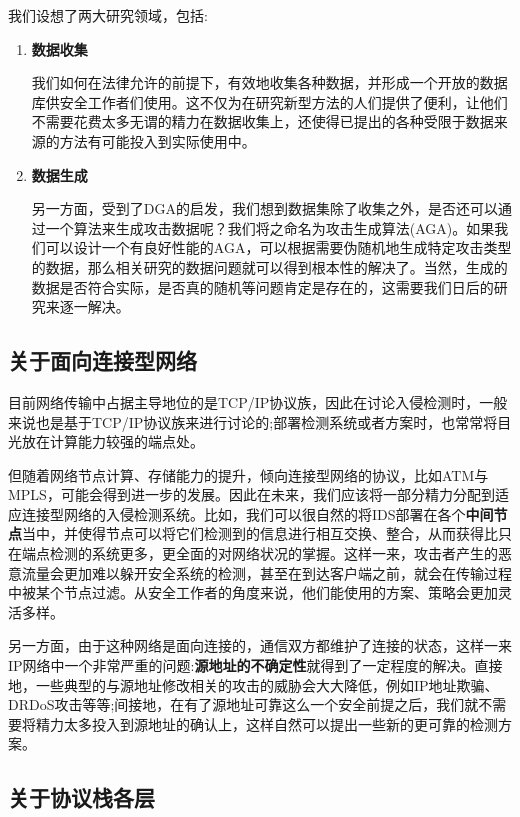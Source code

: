 \documentclass[12pt]{article} %
\begin{document}
我们设想了两大研究领域，包括:

\begin{enumerate}
	\item \textbf{数据收集}

	我们如何在法律允许的前提下，有效地收集各种数据，并形成一个开放的数据库供安全工作者们使用。这不仅为在研究新型方法的人们提供了便利，让他们不需要花费太多无谓的精力在数据收集上，还使得已提出的各种受限于数据来源的方法有可能投入到实际使用中。

	\item \textbf{数据生成}

	另一方面，受到了DGA的启发，我们想到数据集除了收集之外，是否还可以通过一个算法来生成攻击数据呢？我们将之命名为攻击生成算法(AGA)。如果我们可以设计一个有良好性能的AGA，可以根据需要伪随机地生成特定攻击类型的数据，那么相关研究的数据问题就可以得到根本性的解决了。当然，生成的数据是否符合实际，是否真的随机等问题肯定是存在的，这需要我们日后的研究来逐一解决。
\end{enumerate}
\subsection{关于面向连接型网络}
\label{connect}

目前网络传输中占据主导地位的是TCP/IP协议族，因此在讨论入侵检测时，一般来说也是基于TCP/IP协议族来进行讨论的;部署检测系统或者方案时，也常常将目光放在计算能力较强的端点处。

但随着网络节点计算、存储能力的提升，倾向连接型网络的协议，比如ATM与MPLS，可能会得到进一步的发展。因此在未来，我们应该将一部分精力分配到适应连接型网络的入侵检测系统。比如，我们可以很自然的将IDS部署在各个\textbf{中间节点}当中，并使得节点可以将它们检测到的信息进行相互交换、整合，从而获得比只在端点检测的系统更多，更全面的对网络状况的掌握。这样一来，攻击者产生的恶意流量会更加难以躲开安全系统的检测，甚至在到达客户端之前，就会在传输过程中被某个节点过滤。从安全工作者的角度来说，他们能使用的方案、策略会更加灵活多样。

另一方面，由于这种网络是面向连接的，通信双方都维护了连接的状态，这样一来IP网络中一个非常严重的问题:\textbf{源地址的不确定性}就得到了一定程度的解决。直接地，一些典型的与源地址修改相关的攻击的威胁会大大降低，例如IP地址欺骗、DRDoS攻击等等;间接地，在有了源地址可靠这么一个安全前提之后，我们就不需要将精力太多投入到源地址的确认上，这样自然可以提出一些新的更可靠的检测方案。 %
\subsection{关于协议栈各层}
\label{layer}
\end{document}
